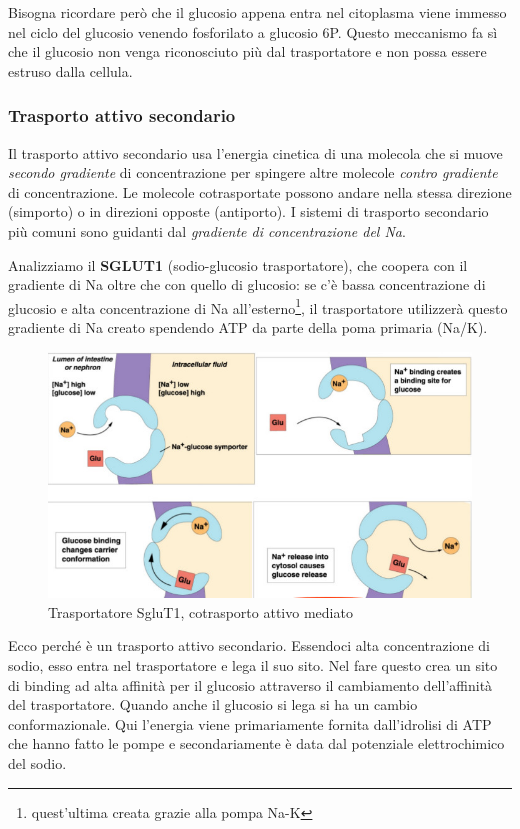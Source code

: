 \documentclass[a4paper,12pt]{article}
\begin{document}
Bisogna ricordare però che il glucosio appena entra nel citoplasma viene immesso nel ciclo del glucosio venendo fosforilato a glucosio 6P. Questo meccanismo fa sì che il glucosio non venga
riconosciuto più dal trasportatore e non possa essere estruso dalla cellula.

\subsubsection{Trasporto attivo secondario}
Il trasporto attivo secondario usa l'energia cinetica di una molecola che si muove \emph{secondo gradiente} di concentrazione per spingere altre molecole \emph{contro gradiente} di concentrazione.
Le molecole cotrasportate possono andare nella stessa direzione (simporto) o in direzioni opposte (antiporto). I sistemi di trasporto secondario più comuni sono guidanti dal \emph{gradiente di concentrazione del Na}.

Analizziamo il \textbf{SGLUT1} (sodio-glucosio trasportatore), che coopera con il gradiente di Na oltre che con quello di glucosio: se c'è bassa concentrazione di glucosio e alta concentrazione di Na  all'esterno\footnote{quest'ultima creata grazie alla pompa Na-K}, il trasportatore utilizzerà questo gradiente di Na creato spendendo ATP da parte della poma primaria (Na/K).
\begin{figure}[H]
\centering
\includegraphics[scale=0.3]{immagine/sglut1.jpg}
\caption{Trasportatore SgluT1, cotrasporto attivo mediato}
\end{figure}
Ecco perché è un trasporto attivo secondario.
Essendoci alta concentrazione di sodio, esso entra nel trasportatore e lega il suo sito. Nel
fare questo crea un sito di binding ad alta affinità per il glucosio attraverso il cambiamento dell’affinità
del trasportatore. Quando anche il glucosio si
lega si ha un cambio conformazionale. Qui
l’energia viene primariamente fornita
dall’idrolisi di ATP che hanno fatto le pompe e
secondariamente è data dal potenziale elettrochimico del sodio. 
\end{document}
